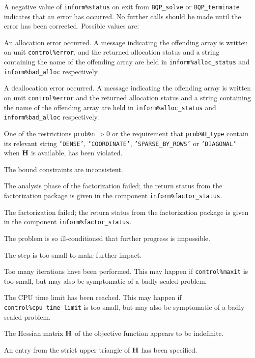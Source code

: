 \documentclass{galahad}
\newcommand{\packagename}{BQP}
\begin{document}
\galerrors
A negative value of {\tt inform\%status} on exit from 
{\tt \packagename\_solve}
or 
{\tt \packagename\_terminate}
indicates that an error has occurred. No further calls should be made
until the error has been corrected. Possible values are:

\begin{description}

 An allocation error occurred. A message indicating 
the offending 
array is written on unit {\tt control\%error}, and the returned allocation 
status and a string containing the name of the offending array
are held in {\tt inform\%alloc\_\-status}
and {\tt inform\%bad\_alloc} respectively.

 A deallocation error occurred. 
A message indicating the offending 
array is written on unit {\tt control\%error} and the returned allocation 
status and a string containing the name of the offending array
are held in {\tt inform\%alloc\_\-status}
and {\tt inform\%bad\_alloc} respectively.

 One of the restrictions 
 {\tt prob\%n} $> 0$ 
    or the requirement that 
    {\tt prob\%H\_type} contain its relevant string
    {\tt 'DENSE'}, {\tt 'COORDINATE'}, {\tt 'SPARSE\_BY\_ROWS'}
    or {\tt 'DIAGONAL'} when ${\mathbf{H}}$ is available,
    has been violated.


 The bound constraints are inconsistent.

 The analysis phase of the factorization failed; 
  the return status from the factorization
    package is given in the component {\tt inform\%fac\-t\-or\_status}.

 The factorization failed; the return status 
  from the factorization
    package is given in the component {\tt inform\%fac\-t\-or\_status}.

 The problem is so ill-conditioned that 
 further progress is impossible.

 The step is too small to make further impact.

 Too many iterations have been performed. 
   This may happen if
    {\tt control\%maxit} is too small, but may also be symptomatic of 
    a badly scaled problem.

 The CPU time limit has been reached. This may happen if
    {\tt control\%cpu\_time\_limit} is too small, but may also be symptomatic 
    of a badly scaled problem.

 The Hessian matrix ${\mathbf{H}}$ of the objective function 
  appears to be indefinite.

 An entry from the strict upper triangle of ${\mathbf{H}}$ 
 has been specified.

\end{description}
\end{document}
